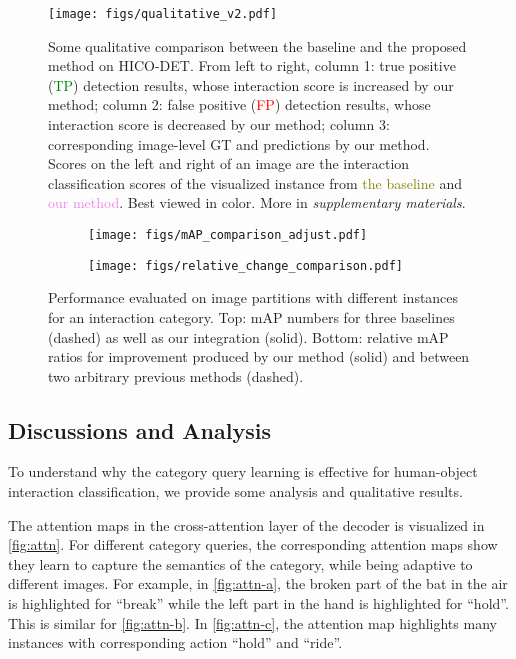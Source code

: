 \documentclass[10pt,twocolumn,letterpaper]{article}
\def\supp{\textit{\textcolor{BrickRed}{supplementary materials}}}
\begin{document}
\begin{figure}
  \centering
\texttt{[image: figs/qualitative\_v2.pdf]}
  \caption{Some qualitative comparison between the baseline and the proposed method on HICO-DET.
  From left to right, column 1: true positive (\textcolor{Green}{TP}) detection results, whose interaction score is increased by our method; column 2: false positive (\textcolor{red}{FP}) detection results, whose interaction score is decreased by our method; column 3: corresponding image-level GT and predictions by our method. Scores on the left and right of an image are the interaction classification scores of the visualized instance from \textcolor{olive}{the baseline} and \textcolor{Violet}{our method}. Best viewed in color. More in \supp.
  }
  \vspace{-8pt}
  \label{fig:qualitative}
\end{figure}

\begin{figure}
  \centering
  \begin{subfigure}{0.9\linewidth}
\texttt{[image: figs/mAP\_comparison\_adjust.pdf]}
    \vspace{-4mm}
\label{fig:analysis-a}
  \end{subfigure}
  \begin{subfigure}{0.9\linewidth}
\texttt{[image: figs/relative\_change\_comparison.pdf]}
\label{fig:analysis-c}
  \end{subfigure}
  \vspace{-8mm}
  \caption{Performance evaluated on image partitions with different  instances for an interaction category. Top: mAP numbers for three baselines (dashed) as well as our integration (solid). Bottom: relative mAP ratios for improvement produced by our method (solid) and between two arbitrary previous methods (dashed).
  }
  \vspace{-8pt}
  \label{fig:densityanalysis}
\end{figure}

\subsection{Discussions and Analysis}
\label{subsec:analysis}
To understand why the category query learning is effective for human-object interaction classification, we provide some analysis and qualitative results. 

The attention maps in the cross-attention layer of the decoder is visualized in \cref{fig:attn}. For different category queries, the corresponding attention maps show they learn to capture the semantics of the category, while being adaptive to different images. For example, in \cref{fig:attn-a}, the broken part of the bat in the air is highlighted for ``break'' while the left part in the hand is highlighted for ``hold''. This is similar for \cref{fig:attn-b}. In \cref{fig:attn-c}, the attention map highlights many instances with corresponding action ``hold'' and ``ride''.
\end{document}
